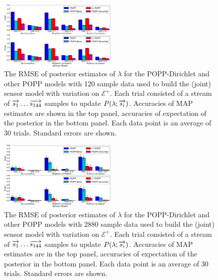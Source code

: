 \begin{figure}[t!]
	\centering
	\includegraphics[width=0.5\textwidth]{./figures/tjpr_comparison_120.png}
    \caption{The RMSE of posterior estimates of $\lambda$ for the POPP-Dirichlet and other POPP models with 120 sample data used to build the (joint) sensor model with variation on $\mathcal{E^+}$. Each trial consisted of a stream of $\protect\overrightarrow{s_1} \ldots \protect\overrightarrow{s_{144}}$ samples to update $P(\lambda ; \protect\overrightarrow{s_i})$. Accuracies of MAP estimates are shown in the top panel, accuracies of expectation of the posterior in the bottom panel. Each data point is an average of 30 trials. Standard errors are shown.} 
	\label{fig:tjpr_comparison_120}
\end{figure}

\begin{figure}[t!]
	\centering
	\includegraphics[width=0.5\textwidth]{./figures/tjpr_comparison_2880.png}
    \caption{The RMSE of posterior estimates of $\lambda$ for the POPP-Dirichlet and other POPP models with 2880 sample data used to build the (joint) sensor model with variation on $\mathcal{E^+}$. Each trial consisted of a stream of $\protect\overrightarrow{s_1} \ldots \protect\overrightarrow{s_{144}}$ samples to update $P(\lambda ; \protect\overrightarrow{s_i})$. Accuracies of MAP estimates are in the top panel, accuracies of expectation of the posterior in the bottom panel. Each data point is an average of 30 trials. Standard errors are shown.} 
	\label{fig:tjpr_comparison_2880}
\end{figure}

